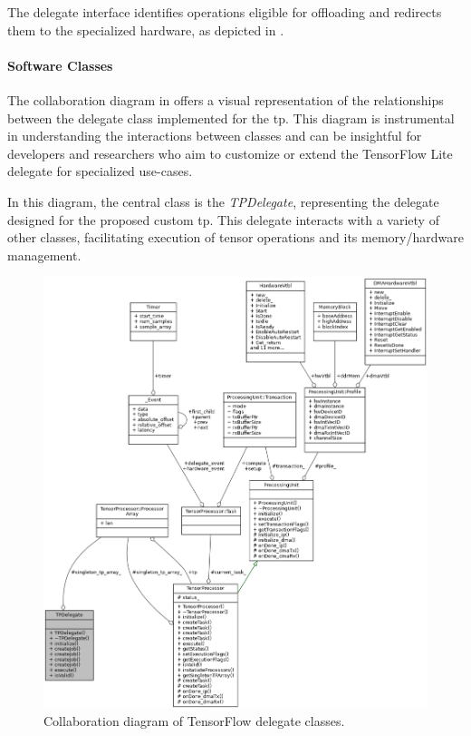 The delegate interface identifies operations eligible for offloading and redirects them to the specialized hardware, as depicted in .

\paragraph{Software Classes}

The collaboration diagram in  offers a visual representation of the relationships between the delegate class implemented for the \gls{tp}. This diagram is instrumental in understanding the interactions between classes and can be insightful for developers and researchers who aim to customize or extend the TensorFlow Lite delegate for specialized use-cases.

In this diagram, the central class is the \textit{TPDelegate}, representing the delegate designed for the proposed custom \gls{tp}. This delegate interacts with a variety of other classes, facilitating execution of tensor operations and its memory/hardware management.

\begin{figure}[h!]
	\centering
	\includegraphics[width=\textwidth]{./figures/class_t_p_delegate__coll__graph.png}
	\caption{Collaboration diagram of TensorFlow delegate classes.}
	\label{fig:sw_tp_delegate_diagram}
\end{figure}
\FloatBarrier

